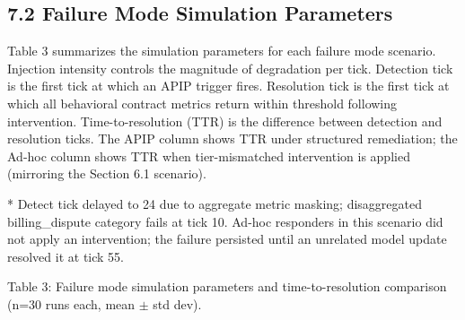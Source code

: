 \subsection{7.2  Failure Mode Simulation Parameters}

Table 3 summarizes the simulation parameters for each failure mode scenario. Injection intensity controls the magnitude of degradation per tick. Detection tick is the first tick at which an APIP trigger fires. Resolution tick is the first tick at which all behavioral contract metrics return within threshold following intervention. Time-to-resolution (TTR) is the difference between detection and resolution ticks. The APIP column shows TTR under structured remediation; the Ad-hoc column shows TTR when tier-mismatched intervention is applied (mirroring the Section 6.1 scenario).

* Detect tick delayed to 24 due to aggregate metric masking; disaggregated billing\_dispute category fails at tick 10. \dag{} Ad-hoc responders in this scenario did not apply an intervention; the failure persisted until an unrelated model update resolved it at tick 55.

Table 3: Failure mode simulation parameters and time-to-resolution comparison (n=30 runs each, mean $\pm$ std dev).


